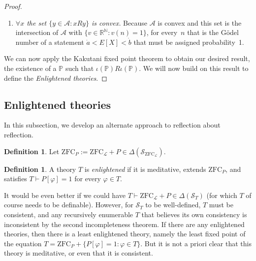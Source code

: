 \documentclass[12pt]{article}
\newcommand{\PP}{\mathbb{P}}
\newcommand{\vp}{\varphi}
\newcommand{\RR}{\mathbb{R}}
\newcommand{\NN}{\mathbb{N}}
\newcommand{\zfc}{\mathrm{ZFC}}
\newcommand{\zfcl}{{\zfc_\cL}}
\newcommand{\zfcp}{{\zfc_P}}
\newcommand{\cL}{\mathcal{L}}
\newcommand{\cS}{\mathcal{S}}
\theoremstyle{plain}
\theoremstyle{definition}
\newtheorem{definition}[theorem]{Definition}
\theoremstyle{remark}
\begin{document}
\begin{proof}
\begin{enumerate}
\item \emph{$\forall x$ the set $\{y \in \mathcal{A}: xRy\}$ is convex.} Because $\mathcal{A}$ is convex and this set is the intersection of $\mathcal{A}$ with $\{v\in\RR^\NN : v(n) = 1\}$, for every~$n$ that is the G\"odel number of a statement $\dot a < E[X] < \dot b$ that must be assigned probability~1.
\end{enumerate}

We can now apply the Kakutani fixed point theorem to obtain our desired result, the existence of a $\PP$ such that $\iota(\PP)R\iota(\PP)$. We will now build on this result to define the \emph{Enlightened theories}.

\end{proof}
\subsection{Enlightened theories}
In this subsection, we develop an alternate approach to reflection about reflection.
\begin{definition}
Let $\zfcp := \zfcl + P\in\Delta(\cS_\zfcl)$.
\end{definition}
\begin{definition}
A theory $T$ is \emph{enlightened} if it is meditative, extends $\zfcp$, and satisfies $T\vdash P[\vp] = 1$ for every $\vp\in T$.
\end{definition}
It would be even better if we could have $T\vdash\zfcl + P\in\Delta(\cS_T)$ (for which $T$ of course needs to be definable). However, for $\cS_T$ to be well-defined, $T$ must be consistent, and any recursively enumerable $T$ that believes its own consistency is inconsistent by the second incompleteness theorem.
If there are any enlightened theories, then there is a least enlightened theory, namely the least fixed point of the equation $T = \zfcp + \{P[\vp] = 1 : \vp\in T\}$. But it is not a priori clear that this theory is meditative, or even that it is consistent. 
\end{document}
